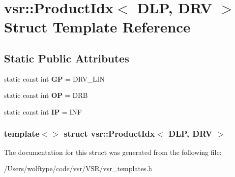 \hypertarget{structvsr_1_1_product_idx_3_01_d_l_p_00_01_d_r_v_01_4}{\section{vsr\-:\-:Product\-Idx$<$ D\-L\-P, D\-R\-V $>$ Struct Template Reference}
\label{structvsr_1_1_product_idx_3_01_d_l_p_00_01_d_r_v_01_4}
}
\subsection*{Static Public Attributes}
\begin{DoxyCompactItemize}
\item 
\hypertarget{structvsr_1_1_product_idx_3_01_d_l_p_00_01_d_r_v_01_4_a330f29602cf0b63dfee69d02285cb203}{static const int {\bfseries G\-P} = D\-R\-V\-\_\-\-L\-I\-N}\label{structvsr_1_1_product_idx_3_01_d_l_p_00_01_d_r_v_01_4_a330f29602cf0b63dfee69d02285cb203}

\item 
\hypertarget{structvsr_1_1_product_idx_3_01_d_l_p_00_01_d_r_v_01_4_a8b02e05ae6fe190daaec249e1f0d98f7}{static const int {\bfseries O\-P} = D\-R\-B}\label{structvsr_1_1_product_idx_3_01_d_l_p_00_01_d_r_v_01_4_a8b02e05ae6fe190daaec249e1f0d98f7}

\item 
\hypertarget{structvsr_1_1_product_idx_3_01_d_l_p_00_01_d_r_v_01_4_aca6979fb0db7a2dd550e0ed0027ebd1e}{static const int {\bfseries I\-P} = I\-N\-F}\label{structvsr_1_1_product_idx_3_01_d_l_p_00_01_d_r_v_01_4_aca6979fb0db7a2dd550e0ed0027ebd1e}

\end{DoxyCompactItemize}
\subsubsection*{template$<$$>$ struct vsr\-::\-Product\-Idx$<$ D\-L\-P, D\-R\-V $>$}



The documentation for this struct was generated from the following file\-:\begin{DoxyCompactItemize}
\item 
/\-Users/wolftype/code/vsr/\-V\-S\-R/vsr\-\_\-templates.\-h\end{DoxyCompactItemize}
